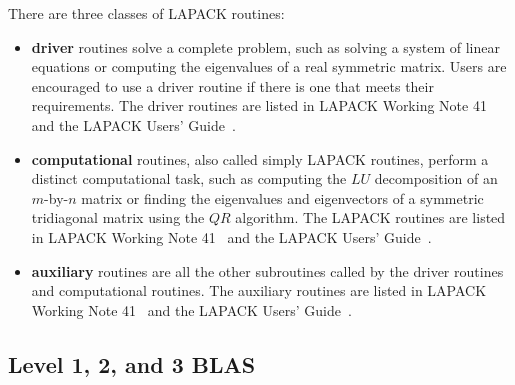 \hspace{\parindent}
There are three classes of LAPACK routines:
\begin{itemize}

\item {\bf driver} routines solve a complete problem, such as solving
a system of linear equations or computing the eigenvalues of a real
symmetric matrix.  Users are encouraged to use a driver routine if there
is one that meets their requirements.  The driver routines are listed
in LAPACK Working Note 41~\cite{WN41} and the LAPACK Users' Guide~\cite{LUG}.

\item {\bf computational} routines, also called simply LAPACK routines,
perform a distinct computational task, such as computing
the $LU$ decomposition of an $m$-by-$n$ matrix or finding the
eigenvalues and eigenvectors of a symmetric tridiagonal matrix using
the $QR$ algorithm. 
The LAPACK routines are listed in LAPACK Working Note 41~\cite{WN41}
and the LAPACK Users' Guide~\cite{LUG}.

\item {\bf auxiliary} routines are all the other subroutines called
by the driver routines and computational routines.  
The auxiliary routines are listed in LAPACK Working Note 41~\cite{WN41}
and the LAPACK Users' Guide~\cite{LUG}.
\end{itemize}

\subsection{Level 1, 2, and 3 BLAS}

